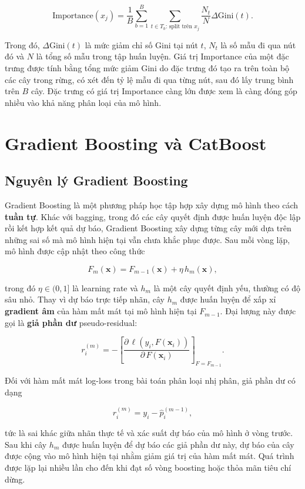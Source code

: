\documentclass[a4paper]{report}
\begin{document}
\[
  \text{Importance}(x_j)=\frac{1}{B}\sum_{b=1}^{B}
  \sum_{t\in T_b:\,\text{split trên }x_j}
  \frac{N_t}{N}\Delta\text{Gini}(t).
\]

Trong đó, $\Delta\text{Gini}(t)$ là mức giảm chỉ số Gini tại nút $t$, $N_t$ là
số mẫu đi qua nút đó và $N$ là tổng số mẫu trong tập huấn luyện. Giá trị
Importance của một đặc trưng được tính bằng tổng mức giảm Gini do đặc trưng đó
tạo ra trên toàn bộ các cây trong rừng, có xét đến tỷ lệ mẫu đi qua từng nút,
sau đó lấy trung bình trên $B$ cây. Đặc trưng có giá trị Importance càng lớn
được xem là càng đóng góp nhiều vào khả năng phân loại của mô hình.

\section{Gradient Boosting và CatBoost}
\label{sec:catboost}

\subsection{Nguyên lý Gradient Boosting}

Gradient Boosting là một phương pháp học tập hợp xây dựng mô hình theo cách
\textbf{tuần tự}. Khác với bagging, trong đó các cây quyết định được huấn luyện
độc lập rồi kết hợp kết quả dự báo, Gradient Boosting xây dựng từng cây mới dựa
trên những sai số mà mô hình hiện tại vẫn chưa khắc phục được. Sau mỗi vòng
lặp, mô hình được cập nhật theo công thức

\[
  F_m(\mathbf{x}) = F_{m-1}(\mathbf{x}) + \eta\,h_m(\mathbf{x}),
\]

trong đó $\eta \in (0,1]$ là learning rate và $h_m$ là một cây quyết định yếu,
thường có độ sâu nhỏ. Thay vì dự báo trực tiếp nhãn, cây
$h_m$ được huấn luyện để xấp xỉ \textbf{gradient âm} của hàm mất mát tại mô
hình hiện tại $F_{m-1}$. Đại lượng này được gọi là \textbf{giả phần dư}
pseudo-residual:

\[
  r_i^{(m)}
  =
  -
  \left[
    \frac{\partial\,\ell(y_i,F(\mathbf{x}_i))}
    {\partial\,F(\mathbf{x}_i)}
  \right]_{F=F_{m-1}}.
\]

Đối với hàm mất mát log-loss trong bài toán phân loại nhị phân, giả phần dư có
dạng

\[
r_i^{(m)} = y_i - \hat{p}_i^{(m-1)},
\]

tức là sai khác giữa nhãn thực tế và xác suất dự báo của mô hình ở vòng trước.
Sau khi cây $h_m$ được huấn luyện để dự báo các giả phần dư này, dự báo của cây
được cộng vào mô hình hiện tại nhằm giảm giá trị của hàm mất mát. Quá trình
được lặp lại nhiều lần cho đến khi đạt số vòng boosting hoặc thỏa mãn tiêu chí
dừng.
\end{document}
